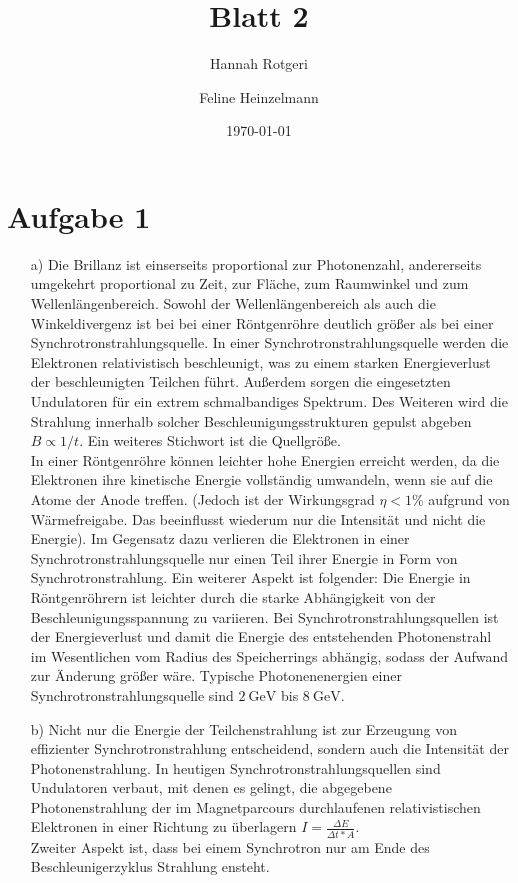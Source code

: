 \documentclass[11pt,a4paper]{article}
\title{Blatt 2}
\date{\today}
\author{Hannah Rotgeri \and Feline Heinzelmann}
\begin{document}
    \maketitle

    \section*{Aufgabe 1}
    	\begin{enumerate}
		\item[a)] Die Brillanz ist einserseits proportional zur Photonenzahl, andererseits umgekehrt proportional zu Zeit, zur Fläche, zum Raumwinkel und zum Wellenlängenbereich. Sowohl der Wellenlängenbereich als auch die Winkeldivergenz ist bei bei einer Röntgenröhre deutlich größer als bei einer Synchrotronstrahlungsquelle. In einer Synchrotronstrahlungsquelle werden die Elektronen relativistisch beschleunigt, was zu einem starken Energieverlust der beschleunigten Teilchen führt. Außerdem sorgen die eingesetzten Undulatoren für ein extrem schmalbandiges Spektrum. Des Weiteren wird die Strahlung innerhalb solcher Beschleunigungsstrukturen gepulst abgeben \( B \propto 1/t \). Ein weiteres Stichwort ist die Quellgröße. \\
		
		In einer Röntgenröhre können leichter hohe Energien erreicht werden, da die Elektronen ihre kinetische Energie vollständig umwandeln, wenn sie auf die Atome der Anode treffen. (Jedoch ist der Wirkungsgrad \( \eta < 1\% \) aufgrund von Wärmefreigabe. Das beeinflusst wiederum nur die Intensität und nicht die Energie). Im Gegensatz dazu verlieren die Elektronen in einer Synchrotronstrahlungsquelle nur einen Teil ihrer Energie in Form von Synchrotronstrahlung. Ein weiterer Aspekt ist folgender: Die Energie in Röntgenröhrern ist leichter durch die starke Abhängigkeit von der Beschleunigungsspannung zu variieren. Bei Synchrotronstrahlungsquellen ist der Energieverlust und damit die Energie des entstehenden Photonenstrahl im Wesentlichen vom Radius des Speicherrings abhängig, sodass der Aufwand zur Änderung größer wäre.
		Typische Photonenenergien einer Synchrotronstrahlungsquelle sind \(\SI{2}{\giga\electronvolt} \) bis \(\SI{8}{\giga\electronvolt} \). 
        \item[b)] Nicht nur die Energie der Teilchenstrahlung ist zur Erzeugung von effizienter Synchrotronstrahlung entscheidend, sondern auch die Intensität der Photonenstrahlung. In heutigen Synchrotronstrahlungsquellen sind Undulatoren verbaut, mit denen es gelingt, die abgegebene Photonenstrahlung der im Magnetparcours durchlaufenen relativistischen Elektronen in einer Richtung zu überlagern \(I = \frac{\Delta E}{\Delta t * A}\). \\
        Zweiter Aspekt ist, dass bei einem Synchrotron nur am Ende des Beschleunigerzyklus Strahlung ensteht.
	\end{enumerate}
	
\end{document}
